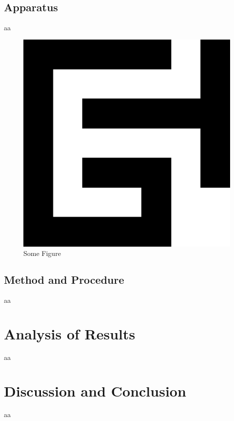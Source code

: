 \documentclass{article}
\begin{document}
\subsection{Apparatus}
aa
\begin{figure}[H]
  \includegraphics[width=\linewidth,natwidth=512,natheight=512]{img/hoge.png}
  \caption{Some Figure}
\end{figure}

\subsection{Method and Procedure}
aa

\section{Analysis of Results}
aa

\section{Discussion and Conclusion}
aa

\printbibliography
\end{document}
